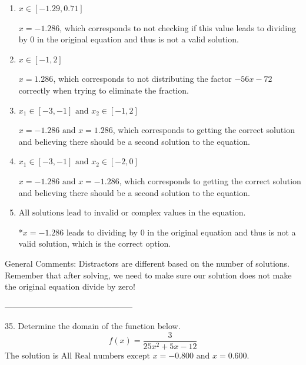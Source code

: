 \documentclass{extbook}[14pt]
\begin{document}
\begin{enumerate}[label=\Alph*.] 
\item $ x \in [-1.29,0.71] $ 

 $x = -1.286$, which corresponds to not checking if this value leads to dividing by 0 in the original equation and thus is not a valid solution. 
\item $ x \in [-1,2] $ 

 $x = 1.286$, which corresponds to not distributing the factor $-56x -72$ correctly when trying to eliminate the fraction. 
\item $ x_1 \in [-3, -1] \text{ and } x_2 \in [-1,2] $ 

 $x = -1.286 \text{ and } x = 1.286$, which corresponds to getting the correct solution and believing there should be a second solution to the equation. 
\item $ x_1 \in [-3, -1] \text{ and } x_2 \in [-2,0] $ 

 $x = -1.286 \text{ and } x = -1.286$, which corresponds to getting the correct solution and believing there should be a second solution to the equation. 
\item $ \text{All solutions lead to invalid or complex values in the equation.} $ 

 *$x = -1.286$ leads to dividing by 0 in the original equation and thus is not a valid solution, which is the correct option. 
\end{enumerate} 
 
General Comments: Distractors are different based on the number of solutions. Remember that after solving, we need to make sure our solution does not make the original equation divide by zero!

-----------------------------------------------

35. Determine the domain of the function below.
\[ f(x) = \frac{3}{25x^{2} +5 x -12} \] 
The solution is $ \text{All Real numbers except } x = -0.800 \text{ and } x = 0.600. $ 
\end{document}
